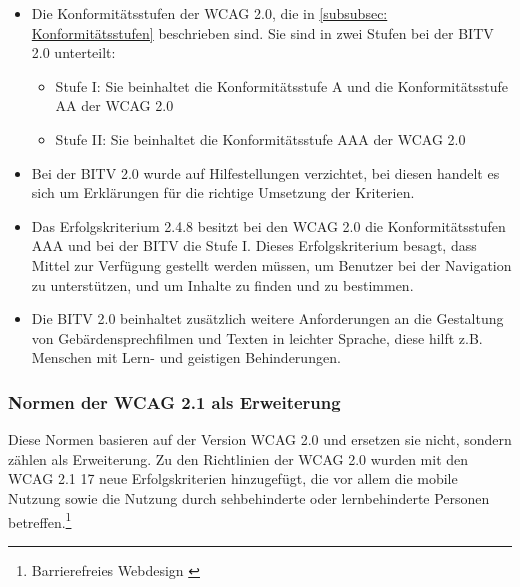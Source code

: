 \begin{itemize}
	\item Die Konformitätsstufen der \ac{WCAG} 2.0, die in \cref{subsubsec: Konformitätsstufen} beschrieben sind. Sie sind in zwei Stufen bei 
	der \ac{BITV} 2.0 unterteilt:
		\begin{itemize}
			\item Stufe I: Sie beinhaltet die Konformitätsstufe A und die Konformitätsstufe AA der \ac{WCAG} 2.0
			\item Stufe II: Sie beinhaltet die Konformitätsstufe AAA der \ac{WCAG} 2.0
		\end{itemize}
	
	\item Bei der \ac{BITV} 2.0 wurde auf Hilfestellungen verzichtet, bei diesen handelt es sich um Erklärungen für die richtige Umsetzung der Kriterien.
	
	\item Das Erfolgskriterium 2.4.8 besitzt bei den \ac{WCAG} 2.0 die Konformitätsstufen AAA und bei der \ac{BITV} die Stufe I. Dieses Erfolgskriterium besagt, dass 
	Mittel zur Verfügung gestellt werden müssen, um Benutzer bei der Navigation zu unterstützen, und um Inhalte zu finden und zu bestimmen.
	
	\item Die \ac{BITV} 2.0 beinhaltet zusätzlich weitere Anforderungen an die Gestaltung von Gebärdensprechfilmen und Texten in leichter Sprache, diese hilft
	z.B. Menschen mit Lern- und geistigen Behinderungen.
\end{itemize}

\subsubsection{Normen der \ac{WCAG} 2.1 als Erweiterung}
\label{subsec: Normen der WCAG 2.1}

Diese Normen basieren auf der Version \ac{WCAG} 2.0 und ersetzen sie nicht, sondern zählen als Erweiterung. Zu den Richtlinien der \ac{WCAG} 2.0 wurden mit den \ac{WCAG} 2.1 17 neue Erfolgskriterien hinzugefügt, die vor allem die mobile Nutzung sowie die Nutzung durch sehbehinderte oder lernbehinderte Personen betreffen.\footnote{Barrierefreies Webdesign \cite{BarrierefreiesWebdesign}}

